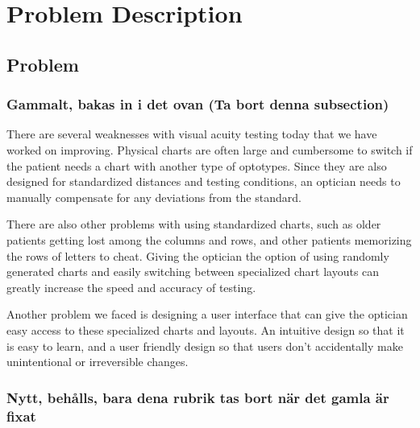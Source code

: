 \documentclass[12pt,a4paper,notitlepage]{report}
\begin{document}
\chapter{ Problem Description}
\section{Problem}
\subsection{Gammalt, bakas in i det ovan (Ta bort denna subsection)}
There are several weaknesses with visual acuity testing today that we have worked on improving. Physical charts are often large and cumbersome to switch if the patient needs a chart with another type of optotypes. Since they are also designed for standardized distances and testing conditions, an optician needs to manually compensate for any deviations from the standard. 

There are also other problems with using standardized charts, such as older patients getting lost among the columns and rows, and other patients memorizing the rows of letters to cheat. Giving the optician the option of using randomly generated charts and easily switching between specialized chart layouts can greatly increase the speed and accuracy of testing.

Another problem we faced is designing a user interface that can give the optician easy access to these specialized charts and layouts. An intuitive design so that it is easy to learn, and a user friendly design so that users don't accidentally make unintentional or irreversible changes.

\subsection{Nytt, behålls, bara dena rubrik tas bort när det gamla är fixat}
\end{document}
